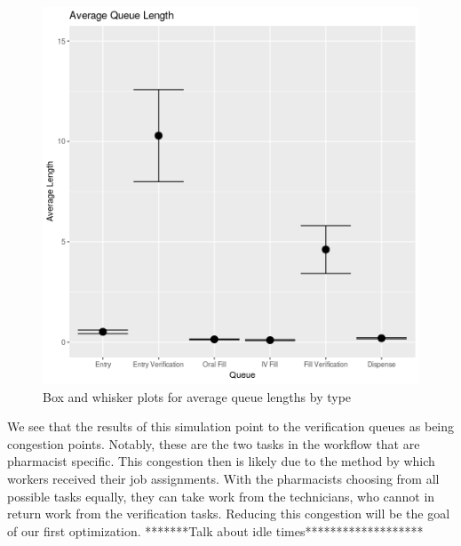 \documentclass[10pt]{report}            %
\begin{document}
\begin{figure}[H]
\centering
\includegraphics[scale=.5]{BaseQueueCIs.png}
\caption{Box and whisker plots for average queue lengths by type}
\label{fig:baseQ}
\end{figure}
We see that the results of this simulation point to the verification queues as being congestion points. Notably, these are the two tasks in the workflow that are pharmacist specific. This congestion then is likely due to the method by which workers received their job assignments. With the pharmacists choosing from all possible tasks equally, they can take work from the technicians, who cannot in return work from the verification tasks. Reducing this congestion will be the goal of our first optimization.
*******Talk about idle times*******************
\end{document}
